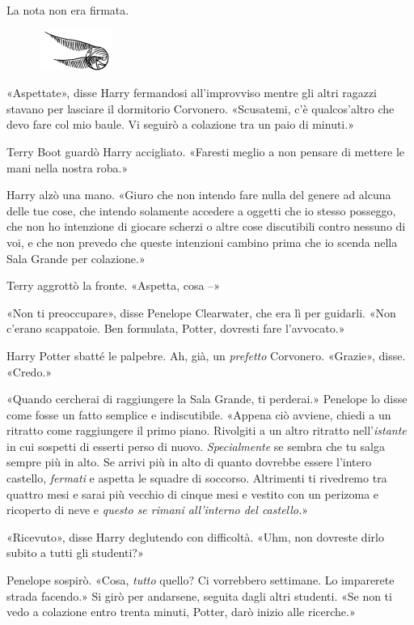 La nota non era firmata.

\begin{figure}[h!]
        \includegraphics[scale=0.4]{boccino.png}
        \centering
\end{figure}

«Aspettate», disse Harry fermandosi all’improvviso mentre gli altri ragazzi stavano per lasciare il dormitorio Corvonero. «Scusatemi, c’è qualcos’altro che devo fare col mio baule. Vi seguirò a colazione tra un paio di minuti.»

Terry Boot guardò Harry accigliato. «Faresti meglio a non pensare di mettere le mani nella nostra roba.»

Harry alzò una mano. «Giuro che non intendo fare nulla del genere ad alcuna delle tue cose, che intendo solamente accedere a oggetti che io stesso posseggo, che non ho intenzione di giocare scherzi o altre cose discutibili contro nessuno di voi, e che non prevedo che queste intenzioni cambino prima che io scenda nella Sala Grande per colazione.»

Terry aggrottò la fronte. «Aspetta, cosa –»

«Non ti preoccupare», disse Penelope Clearwater, che era lì per guidarli. «Non c’erano scappatoie. Ben formulata, Potter, dovresti fare l’avvocato.»

Harry Potter sbatté le palpebre. Ah, già, un \textit{prefetto} Corvonero. «Grazie», disse. «Credo.»

«Quando cercherai di raggiungere la Sala Grande, ti perderai.» Penelope lo disse come fosse un fatto semplice e indiscutibile. «Appena ciò avviene, chiedi a un ritratto come raggiungere il primo piano. Rivolgiti a un altro ritratto nell’\textit{istante} in cui sospetti di esserti perso di nuovo. \textit{Specialmente} se sembra che tu salga sempre più in alto. Se arrivi più in alto di quanto dovrebbe essere l’intero castello, \textit{fermati} e aspetta le squadre di soccorso. Altrimenti ti rivedremo tra quattro mesi e sarai più vecchio di cinque mesi e vestito con un perizoma e ricoperto di neve e \textit{questo se rimani all’interno del castello.}»

«Ricevuto», disse Harry deglutendo con difficoltà. «Uhm, non dovreste dirlo subito a tutti gli studenti?»

Penelope sospirò. «Cosa, \textit{tutto} quello? Ci vorrebbero settimane. Lo imparerete strada facendo.» Si girò per andarsene, seguita dagli altri studenti. «Se non ti vedo a colazione entro trenta minuti, Potter, darò inizio alle ricerche.»

